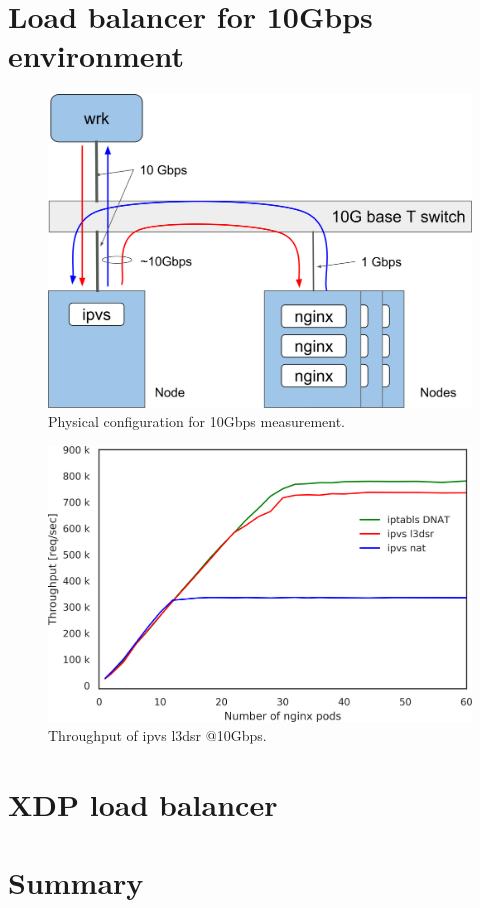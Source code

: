 \section{Load balancer for 10Gbps environment}

\begin{figure}[h]
  \centering
  \includegraphics[width=0.8\columnwidth]{Figs/bench_10g}
  \caption{Physical configuration for 10Gbps measurement.}
  \label{fig:bench_10g}
\end{figure}

\begin{figure}[t]
  \centering
  \includegraphics[width=0.8\columnwidth]{Figs/ipvs_l3dsr_10g.png}
  \caption{Throughput of ipvs l3dsr @10Gbps.}
  \label{fig:ipvs_l3dsr_10g.png}
\end{figure}

\section{XDP load balancer}

\section{Summary}



